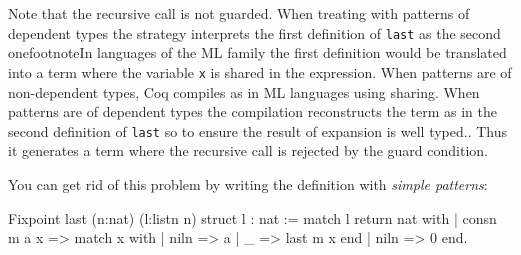 \begin{itemize}
Note that the recursive call   is not
guarded. When treating with patterns of dependent types the strategy
interprets the first definition of \texttt{last} as the second
onefootnote{In languages of the ML family
the first definition would be translated into a term where the
variable \texttt{x} is shared in the expression.  When
patterns are of non-dependent types, Coq compiles as in ML languages
using sharing. When patterns are of dependent types the compilation
reconstructs the term as in the second definition of \texttt{last} so to
ensure the result of expansion is well typed.}.
Thus it generates a
term where the recursive call is rejected by the 
guard condition.

You can get rid of this problem by writing the definition with \emph{simple
patterns}:

\begin{coq_example}
Fixpoint last (n:nat) (l:listn n) {struct l} : nat :=
  match l return nat with
  | consn m a x => match x with
                   | niln => a
                   | _ => last m x
                   end
  | niln => 0%
  end.
\end{coq_example}


\end{itemize}

%

